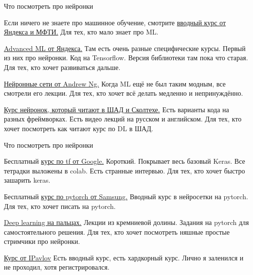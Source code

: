 \documentclass[notes,12pt, aspectratio=169]{beamer}
\newenvironment{wideitemize}{\itemize\addtolength{\itemsep}{10pt}}{\enditemize}
\begin{document}
\begin{frame}{Что посмотреть  про нейронки}
\begin{wideitemize} 
\item Если ничего не знаете про машинное обучение, смотрите \href{https://www.coursera.org/specializations/machine-learning-data-analysis}{вводный курс от Яндекса и МФТИ.} \alert{Для тех, кто мало знает про ML.}

\item  \href{https://www.coursera.org/specializations/aml}{Advanced ML от Яндекса.} Там есть очень разные специфические курсы. Первый из них про нейронки. Код на Tensorflow. Версия библиотеки там пока что старая.  \alert{Для тех, кто хочет развиваться дальше.}

\item  \href{https://www.coursera.org/specializations/deep-learning} {Нейронные сети от Andrew Ng.} Когда ML ещё не был таким модным, все смотрели его лекции. \alert{Для тех, кто хочет всё делать медленно и непринуждённо.}

\item  \href{https://github.com/yandexdataschool/Practical_DL/tree/master}{Курс нейронок, который читают в ШАД и Сколтехе.} Есть варианты кода на разных фреймворках. Есть видео лекций на русском и английском. \alert{Для тех, кто хочет посмотреть как читают курс по DL  в ШАД.}
\end{wideitemize} 
\end{frame} 


\begin{frame}{Что посмотреть  про нейронки}
\begin{wideitemize} 
	
	\item Бесплатный \href{https://www.udacity.com/course/intro-to-tensorflow-for-deep-learning--ud187}{курс по tf от Google.} Короткий. Покрывает весь базовый Keras. Все тетрадки выложены в colab. Есть странные интервью.  \alert{Для тех, кто  хочет быстро зашарить keras.}
	
	\item Бесплатный \href{https://stepik.org/course/50352/syllabus}{курс по pytorch от Samsung.}  Вводный курс в нейросетки на pytorch. \alert{Для тех, кто  хочет писать на pytorch.}
	
	\item  \href{https://dlcourse.ai}{Deep learning на пальцах.} Лекции из кремниевой долины. Задания на pytorch для самостоятельного решения.   \alert{Для тех, кто  хочет посмотреть няшные простые стримчики про нейронки.}
	
	\item \href{http://rusneuro.net/novosti/v-mfti-prohodit-kurs-theoretical-deep-learning-ot-ipavlov}{Курс от IPavlov} Есть вводный курс, есть хардкорный курс.  Лично я заленился и не проходил, хотя регистрировался. 
\end{wideitemize} 
\end{frame} 
\end{document}
